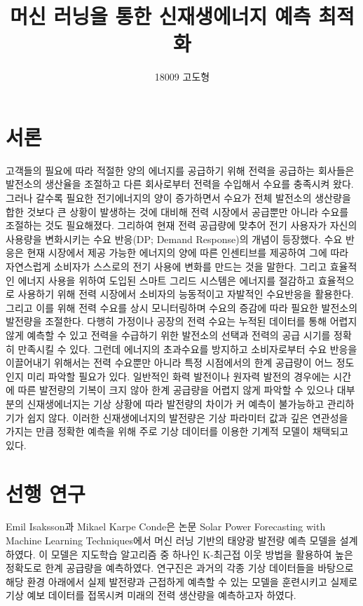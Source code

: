 \documentclass{article}
\begin{document}

\title{머신 러닝을 통한 신재생에너지 예측 최적화}
\author{18009 고도형}
\maketitle

\section{서론}
고객들의 필요에 따라 적절한 양의 에너지를 공급하기 위해 전력을 공급하는 회사들은 발전소의 생산율을 조절하고 다른 회사로부터 전력을 수입해서 수요를 충족시켜 왔다. 그러나 갈수록 필요한 전기에너지의 양이 증가하면서 수요가 전체 발전소의 생산량을 합한 것보다 큰 상황이 발생하는 것에 대비해 전력 시장에서 공급뿐만 아니라 수요를 조절하는 것도 필요해졌다. 그리하여 현재 전력 공급량에 맞추어 전기 사용자가 자신의 사용량을 변화시키는 수요 반응(DP; Demand Response)의 개념이 등장했다. 수요 반응은 현재 시장에서 제공 가능한 에너지의 양에 따른 인센티브를 제공하여 그에 따라 자연스럽게 소비자가 스스로의 전기 사용에 변화를 만드는 것을 말한다. 그리고 효율적인 에너지 사용을 위하여 도입된 스마트 그리드 시스템은 에너지를 절감하고 효율적으로 사용하기 위해 전력 시장에서 소비자의 능동적이고 자발적인 수요반응을 활용한다. 그리고 이를 위해 전력 수요를 상시 모니터링하며 수요의 증감에 따라 필요한 발전소의 발전량을 조절한다. 다행히 가정이나 공장의 전력 수요는 누적된 데이터를 통해 어렵지 않게 예측할 수 있고 전력을 수급하기 위한 발전소의 선택과 전력의 공급 시기를 정확히 만족시킬 수 있다. \newline
그런데 에너지의 초과수요를 방지하고 소비자로부터 수요 반응을 이끌어내기 위해서는 전력 수요뿐만 아니라 특정 시점에서의 한계 공급량이 어느 정도인지 미리 파악할 필요가 있다. 일반적인 화력 발전이나 원자력 발전의 경우에는 시간에 따른 발전량의 기복이 크지 않아 한계 공급량을 어렵지 않게 파악할 수 있으나 대부분의 신재생에너지는 기상 상황에 따라 발전량의 차이가 커 예측이 불가능하고 관리하기가 쉽지 않다. 이러한 신재생에너지의 발전량은 기상 파라미터 값과 깊은 연관성을 가지는 만큼 정확한 예측을 위해 주로 기상 데이터를 이용한 기계적 모델이 채택되고 있다.

\section{선행 연구}
Emil Isaksson과 Mikael Karpe Conde은 논문 Solar Power Forecasting with Machine Learning Techniques에서 머신 러닝 기반의 태양광 발전량 예측 모델을 설계하였다. 이 모델은 지도학습 알고리즘 중 하나인 K-최근접 이웃 방법을 활용하여 높은 정확도로 한계 공급량을 예측하였다. 연구진은 과거의 각종 기상 데이터들을 바탕으로 해당 환경 아래에서 실제 발전량과 근접하게 예측할 수 있는 모델을 훈련시키고 실제로 기상 예보 데이터를 접목시켜 미래의 전력 생산량을 예측하고자 하였다.
\end{document}
